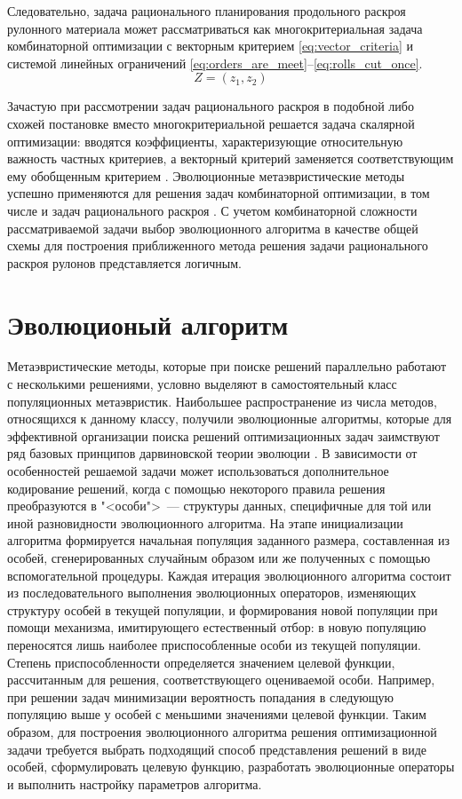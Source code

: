 \documentclass[12pt]{article}
\begin{document}
Следовательно, задача рационального планирования продольного раскроя рулонного 
материала может рассматриваться как многокритериальная задача комбинаторной 
оптимизации с векторным критерием 
\eqref{eq:vector_criteria} 
и системой линейных ограничений 
\eqref{eq:orders_are_meet}--\eqref{eq:rolls_cut_once}.
\begin{equation}\label{eq:vector_criteria}
    Z=(z_1,z_2)
\end{equation}

Зачастую при рассмотрении задач рационального раскроя в подобной либо схожей 
постановке вместо многокритериальной решается задача скалярной оптимизации: 
вводятся коэффициенты, характеризующие относительную важность частных 
критериев, а векторный критерий заменяется соответствующим ему обобщенным 
критерием 
\cite{haessler88, song06, schilling02}. 
Эволюционные метаэвристические методы успешно 
применяются для решения задач комбинаторной оптимизации, в том числе и задач 
рационального раскроя 
\cite{golfeto09}. 
С учетом комбинаторной сложности рассматриваемой 
задачи выбор эволюционного алгоритма в качестве общей схемы для построения 
приближенного метода решения задачи рационального раскроя рулонов 
представляется логичным.


\section{Эволюционый алгоритм}

Метаэвристические методы, которые при поиске решений параллельно работают с 
несколькими решениями, условно выделяют в самостоятельный класс популяционных 
метаэвристик. Наибольшее распространение из числа методов, относящихся к 
данному классу, получили эволюционные алгоритмы, которые для эффективной 
организации поиска решений оптимизационных задач заимствуют ряд базовых 
принципов дарвиновской теории эволюции 
\cite{skobtsov08}. 
В зависимости от особенностей 
решаемой задачи может использоваться дополнительное кодирование решений, когда 
с помощью некоторого правила решения преобразуются в "<особи">~--- структуры 
данных, специфичные для той или иной разновидности эволюционного алгоритма. 
На этапе инициализации алгоритма формируется начальная популяция заданного 
размера, составленная из особей, сгенерированных случайным образом или же 
полученных с помощью вспомогательной процедуры. Каждая итерация эволюционного 
алгоритма состоит из последовательного выполнения эволюционных операторов, 
изменяющих структуру особей в текущей популяции, и формирования новой популяции 
при помощи механизма, имитирующего естественный отбор: в новую популяцию 
переносятся лишь наиболее приспособленные особи из текущей популяции. Степень 
приспособленности определяется значением целевой функции, рассчитанным для 
решения, соответствующего оцениваемой особи. Например, при решении задач 
минимизации вероятность попадания в следующую популяцию выше у особей с 
меньшими значениями целевой функции. Таким образом, для построения 
эволюционного алгоритма решения оптимизационной задачи требуется выбрать 
подходящий способ представления решений в виде особей, сформулировать целевую 
функцию, разработать эволюционные операторы и выполнить настройку параметров 
алгоритма.
\end{document}
